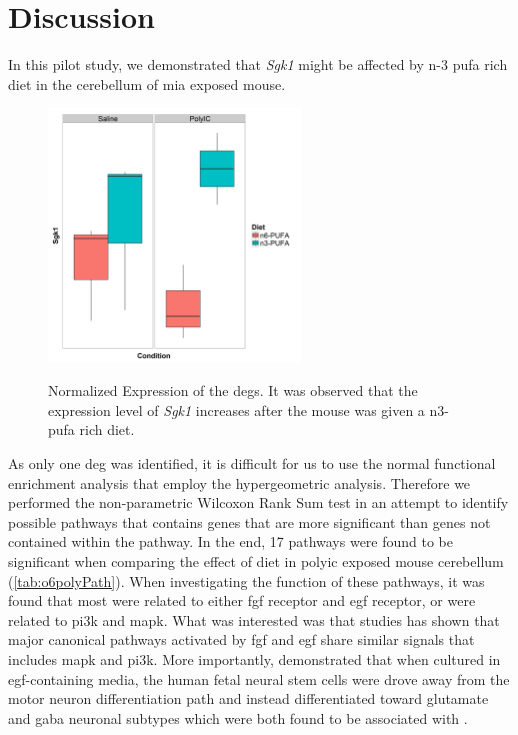 \section{Discussion}
In this pilot study, we demonstrated that \textit{Sgk1} might be affected by n-3 \gls{pufa} rich diet in the cerebellum of \gls{mia} exposed mouse. 

\begin{figure}
		\centering
		\includegraphics[width=0.6\textwidth]{figure/omega/Sgk1_expression.png}
		\label{fig:sgk1Express}
		\caption[Normalized Expression of Differential Expressed Genes]{
			Normalized Expression of the \glspl{deg}.
			It was observed that the expression level of \textit{Sgk1} increases after the mouse was given a n3-\gls{pufa} rich diet.
			}
\end{figure}


As only one \gls{deg} was identified, it is difficult for us to use the normal functional enrichment analysis that employ the hypergeometric analysis. 
Therefore we performed the non-parametric Wilcoxon Rank Sum test in an attempt to identify possible pathways that contains genes that are more significant than genes not contained within the pathway.
In the end, 17 pathways were found to be significant when comparing the effect of diet in \gls{polyic} exposed mouse cerebellum (\cref{tab:o6polyPath}).
When investigating the function of these pathways, it was found that most were related to either \gls{fgf} receptor and \gls{egf} receptor, or were related to \gls{pi3k} and \gls{mapk}.
What was interested was that studies \citep{Ojeda2011,Schlessinger2004} has shown that major canonical pathways activated by \gls{fgf} and \gls{egf} share similar signals that includes \gls{mapk} and \gls{pi3k}.
More importantly, \citet{Ojeda2011} demonstrated that when cultured in \gls{egf}-containing media, the human fetal neural stem cells were drove away from the motor neuron differentiation path and instead differentiated toward glutamate and \gls{gaba} neuronal subtypes which were both found to be associated with  \citep{Wassef2003,Javitt2010,Nakazawa2012}.

